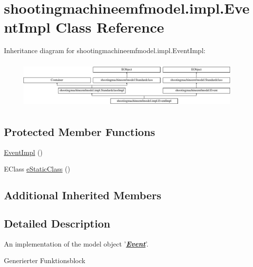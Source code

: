 \hypertarget{classshootingmachineemfmodel_1_1impl_1_1_event_impl}{\section{shootingmachineemfmodel.\-impl.\-Event\-Impl Class Reference}
\label{classshootingmachineemfmodel_1_1impl_1_1_event_impl}
}
Inheritance diagram for shootingmachineemfmodel.\-impl.\-Event\-Impl\-:\begin{figure}[H]
\begin{center}
\leavevmode
\includegraphics[height=2.497213cm]{classshootingmachineemfmodel_1_1impl_1_1_event_impl}
\end{center}
\end{figure}
\subsection*{Protected Member Functions}
\begin{DoxyCompactItemize}
\item 
\hyperlink{classshootingmachineemfmodel_1_1impl_1_1_event_impl_aea9168d7f0fc11bdcba27c5d29694555}{Event\-Impl} ()
\item 
E\-Class \hyperlink{classshootingmachineemfmodel_1_1impl_1_1_event_impl_ab4f5d2a71fb997ec7196be41647f41f0}{e\-Static\-Class} ()
\end{DoxyCompactItemize}
\subsection*{Additional Inherited Members}


\subsection{Detailed Description}
An implementation of the model object '{\itshape {\bfseries \hyperlink{interfaceshootingmachineemfmodel_1_1_event}{Event}}}'.

Generierter Funktionsblock 

